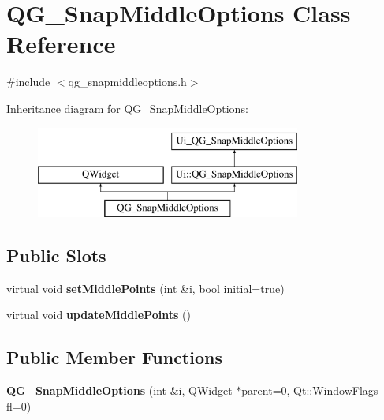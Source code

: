 \hypertarget{classQG__SnapMiddleOptions}{\section{Q\-G\-\_\-\-Snap\-Middle\-Options Class Reference}
\label{classQG__SnapMiddleOptions}
}


{\ttfamily \#include $<$qg\-\_\-snapmiddleoptions.\-h$>$}

Inheritance diagram for Q\-G\-\_\-\-Snap\-Middle\-Options\-:\begin{figure}[H]
\begin{center}
\leavevmode
\includegraphics[height=3.000000cm]{classQG__SnapMiddleOptions}
\end{center}
\end{figure}
\subsection*{Public Slots}
\begin{DoxyCompactItemize}
\item 
\hypertarget{classQG__SnapMiddleOptions_a8284a4db424227ccfcca3d1b1a4332f4}{virtual void {\bfseries set\-Middle\-Points} (int \&i, bool initial=true)}\label{classQG__SnapMiddleOptions_a8284a4db424227ccfcca3d1b1a4332f4}

\item 
\hypertarget{classQG__SnapMiddleOptions_aa4a30a88941a9066deb286b0197be3e1}{virtual void {\bfseries update\-Middle\-Points} ()}\label{classQG__SnapMiddleOptions_aa4a30a88941a9066deb286b0197be3e1}

\end{DoxyCompactItemize}
\subsection*{Public Member Functions}
\begin{DoxyCompactItemize}
\item 
\hypertarget{classQG__SnapMiddleOptions_ad07dc72d724a43f7c3e5ea18084451d8}{{\bfseries Q\-G\-\_\-\-Snap\-Middle\-Options} (int \&i, Q\-Widget $\ast$parent=0, Qt\-::\-Window\-Flags fl=0)}\label{classQG__SnapMiddleOptions_ad07dc72d724a43f7c3e5ea18084451d8}

\end{DoxyCompactItemize}
